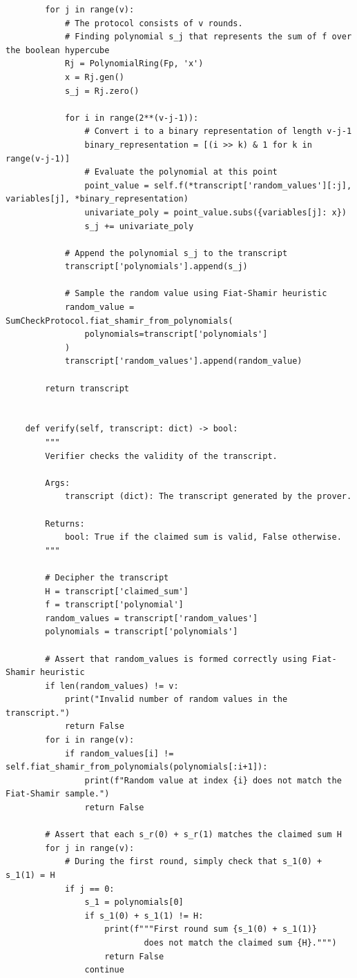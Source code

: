 \documentclass{gkr-template}
\begin{document}
\begin{verbatim}
        for j in range(v):
            # The protocol consists of v rounds.
            # Finding polynomial s_j that represents the sum of f over the boolean hypercube
            Rj = PolynomialRing(Fp, 'x')
            x = Rj.gen()
            s_j = Rj.zero()

            for i in range(2**(v-j-1)):
                # Convert i to a binary representation of length v-j-1
                binary_representation = [(i >> k) & 1 for k in range(v-j-1)]
                # Evaluate the polynomial at this point
                point_value = self.f(*transcript['random_values'][:j], variables[j], *binary_representation)
                univariate_poly = point_value.subs({variables[j]: x})
                s_j += univariate_poly

            # Append the polynomial s_j to the transcript
            transcript['polynomials'].append(s_j)

            # Sample the random value using Fiat-Shamir heuristic
            random_value = SumCheckProtocol.fiat_shamir_from_polynomials(
                polynomials=transcript['polynomials']
            )
            transcript['random_values'].append(random_value)

        return transcript


    def verify(self, transcript: dict) -> bool:
        """
        Verifier checks the validity of the transcript.

        Args:
            transcript (dict): The transcript generated by the prover.

        Returns:
            bool: True if the claimed sum is valid, False otherwise.
        """
        
        # Decipher the transcript
        H = transcript['claimed_sum']
        f = transcript['polynomial']
        random_values = transcript['random_values']
        polynomials = transcript['polynomials']

        # Assert that random_values is formed correctly using Fiat-Shamir heuristic
        if len(random_values) != v:
            print("Invalid number of random values in the transcript.")
            return False
        for i in range(v):
            if random_values[i] != self.fiat_shamir_from_polynomials(polynomials[:i+1]):
                print(f"Random value at index {i} does not match the Fiat-Shamir sample.")
                return False

        # Assert that each s_r(0) + s_r(1) matches the claimed sum H
        for j in range(v):
            # During the first round, simply check that s_1(0) + s_1(1) = H
            if j == 0:
                s_1 = polynomials[0]
                if s_1(0) + s_1(1) != H:
                    print(f"""First round sum {s_1(0) + s_1(1)} 
                            does not match the claimed sum {H}.""")
                    return False
                continue
            

\end{verbatim}
\end{document}
